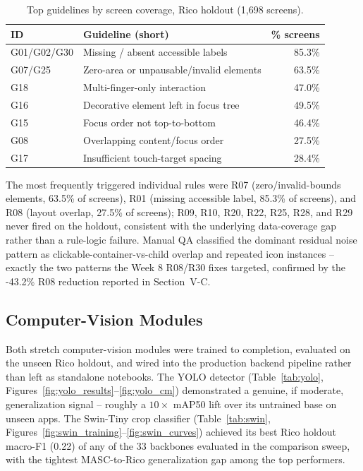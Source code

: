 \documentclass[10pt,conference]{IEEEtran}
\begin{document}
\begin{table}[!t]
\caption{Top guidelines by screen coverage, Rico holdout (1,698 screens).}
\label{tab:topguidelines}
\centering
\scriptsize
\begin{tabular}{@{}p{1.5cm}p{3.4cm}r@{}}
\toprule
\textbf{ID} & \textbf{Guideline (short)} & \textbf{\% screens} \\
\midrule
G01/G02/G30 & Missing / absent accessible labels & 85.3\% \\
G07/G25 & Zero-area or unpausable/invalid elements & 63.5\% \\
G18 & Multi-finger-only interaction & 47.0\% \\
G16 & Decorative element left in focus tree & 49.5\% \\
G15 & Focus order not top-to-bottom & 46.4\% \\
G08 & Overlapping content/focus order & 27.5\% \\
G17 & Insufficient touch-target spacing & 28.4\% \\
\bottomrule
\end{tabular}
\end{table}

The most frequently triggered individual rules were R07 (zero/invalid-bounds elements, 63.5\% of screens), R01 (missing accessible label, 85.3\% of screens), and R08 (layout overlap, 27.5\% of screens); R09, R10, R20, R22, R25, R28, and R29 never fired on the holdout, consistent with the underlying data-coverage gap rather than a rule-logic failure. Manual QA classified the dominant residual noise pattern as clickable-container-vs-child overlap and repeated icon instances -- exactly the two patterns the Week 8 R08/R30 fixes targeted, confirmed by the -43.2\% R08 reduction reported in Section~V-C.

\subsection{Computer-Vision Modules}
Both stretch computer-vision modules were trained to completion, evaluated on the unseen Rico holdout, and wired into the production backend pipeline rather than left as standalone notebooks. The YOLO detector (Table~\ref{tab:yolo}, Figures~\ref{fig:yolo_results}--\ref{fig:yolo_cm}) demonstrated a genuine, if moderate, generalization signal -- roughly a $10\times$ mAP50 lift over its untrained base on unseen apps. The Swin-Tiny crop classifier (Table~\ref{tab:swin}, Figures~\ref{fig:swin_training}--\ref{fig:swin_curves}) achieved its best Rico holdout macro-F1 (0.22) of any of the 33 backbones evaluated in the comparison sweep, with the tightest MASC-to-Rico generalization gap among the top performers.
\end{document}
